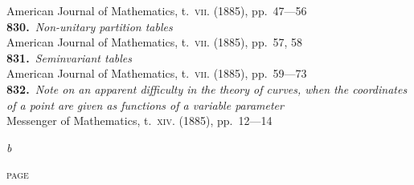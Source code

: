 \documentclass[11pt,a4paper]{article}
\providecommand{\textsc}[1]{{\scshape #1}}
\begin{document}
\hspace*{2em}American Journal of Mathematics, t.~\textsc{vii}. (1885), pp.~47---56\\[0.3em]
\textbf{830.}~\textit{Non-unitary partition tables}~\\
\hspace*{2em}American Journal of Mathematics, t.~\textsc{vii}. (1885), pp.~57, 58\\[0.3em]
\textbf{831.}~\textit{Seminvariant tables}~\\
\hspace*{2em}American Journal of Mathematics, t.~\textsc{vii}. (1885), pp.~59---73\\[0.3em]
\textbf{832.}~\textit{Note on an apparent difficulty in the theory of curves, when the coordinates of a point are given as functions of a variable parameter}~\\
\hspace*{2em}Messenger of Mathematics, t.~\textsc{xiv}. (1885), pp.~12---14

\vspace{1em}
\noindent\textsc{c.\ xii.}\hfill\textit{b}

\clearpage

\thispagestyle{plain}
\vspace*{1em}
\hfill\textsc{page}
\end{document}
